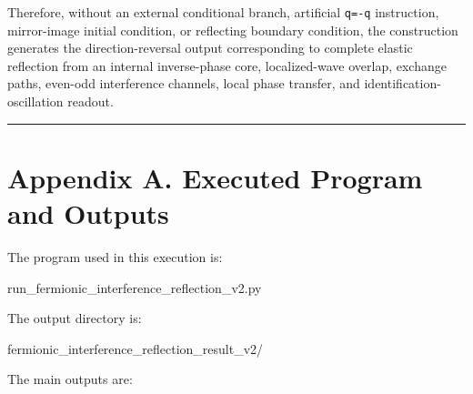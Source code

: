 \documentclass[
  a4paper,
]{article}
\newenvironment{Shaded}{}{}
\newcommand{\NormalTok}[1]{#1}
\begin{document}
Therefore, without an external conditional branch, artificial
\texttt{q=-q} instruction, mirror-image initial condition, or reflecting
boundary condition, the construction generates the direction-reversal
output corresponding to complete elastic reflection from an internal
inverse-phase core, localized-wave overlap, exchange paths, even-odd
interference channels, local phase transfer, and
identification-oscillation readout.

\begin{center}\rule{0.5\linewidth}{0.5pt}\end{center}

\section{Appendix A. Executed Program and
Outputs}\label{appendix-a.-executed-program-and-outputs}

The program used in this execution is:

\begin{Shaded}
\begin{Highlighting}[]
\NormalTok{run\_fermionic\_interference\_reflection\_v2.py}
\end{Highlighting}
\end{Shaded}

The output directory is:

\begin{Shaded}
\begin{Highlighting}[]
\NormalTok{fermionic\_interference\_reflection\_result\_v2/}
\end{Highlighting}
\end{Shaded}

The main outputs are:
\end{document}
